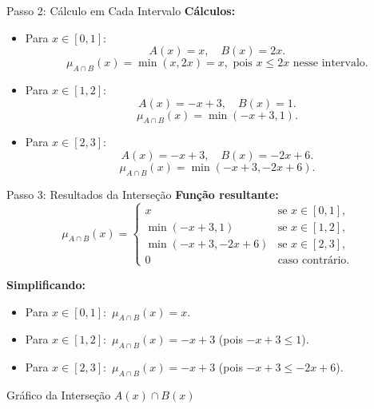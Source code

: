 \documentclass{beamer}
\begin{document}
\begin{frame}{Passo 2: Cálculo em Cada Intervalo}
\footnotesize
\textbf{Cálculos:}
\begin{itemize}
    \item Para \( x \in [0, 1]: \)
    \[
    A(x) = x, \quad B(x) = 2x.
    \]
    \[
    \mu_{A \cap B}(x) = \min(x, 2x) = x, \text{ pois } x \leq 2x \text{ nesse intervalo}.
    \]

    \item Para \( x \in [1, 2]: \)
    \[
    A(x) = -x + 3, \quad B(x) = 1.
    \]
    \[
    \mu_{A \cap B}(x) = \min(-x + 3, 1).
    \]

    \item Para \( x \in [2, 3]: \)
    \[
    A(x) = -x + 3, \quad B(x) = -2x + 6.
    \]
    \[
    \mu_{A \cap B}(x) = \min(-x + 3, -2x + 6).
    \]
\end{itemize}
\end{frame}

\begin{frame}{Passo 3: Resultados da Interseção}
\textbf{Função resultante:}
\[
\mu_{A \cap B}(x) =
\begin{cases}
x & \text{se } x \in [0, 1], \\
\min(-x + 3, 1) & \text{se } x \in [1, 2], \\
\min(-x + 3, -2x + 6) & \text{se } x \in [2, 3], \\
0 & \text{caso contrário}.
\end{cases}
\]

\textbf{Simplificando:}
\begin{itemize}
    \item Para \( x \in [0, 1]: \) \( \mu_{A \cap B}(x) = x \).
    \item Para \( x \in [1, 2]: \) \( \mu_{A \cap B}(x) = -x + 3 \) (pois \( -x + 3 \leq 1 \)).
    \item Para \( x \in [2, 3]: \) \( \mu_{A \cap B}(x) = -x + 3 \) (pois \( -x + 3 \leq -2x + 6 \)).
\end{itemize}
\end{frame}



\begin{frame}{Gráfico da Interseção \(A(x) \cap B(x)\)}
\begin{center}
\end{center}
\end{frame}
\end{document}

